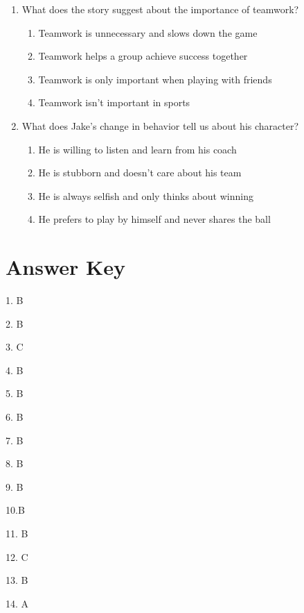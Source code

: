\documentclass[12pt]{article}
\begin{document}
\begin{enumerate}
\vspace{5cm}
    \item What does the story suggest about the importance of teamwork?
    \begin{enumerate}[label=\Alph*.]
        \item Teamwork is unnecessary and slows down the game
        \item Teamwork helps a group achieve success together
        \item Teamwork is only important when playing with friends
        \item Teamwork isn’t important in sports
    \end{enumerate}
    \vspace{0.5cm}

    \item What does Jake's change in behavior tell us about his character?
    \begin{enumerate}[label=\Alph*.]
        \item He is willing to listen and learn from his coach
        \item He is stubborn and doesn’t care about his team
        \item He is always selfish and only thinks about winning
        \item He prefers to play by himself and never shares the ball
    \end{enumerate}
    \vspace{0.5cm}

\end{enumerate}
\newpage
\section*{Answer Key}

1. B  

\vspace{0.2cm}
2. B  

\vspace{0.2cm}
3. C  

\vspace{0.2cm}
4. B 

\vspace{0.2cm}
5. B 

\vspace{0.2cm}
6. B 

\vspace{0.2cm}
7. B  

\vspace{0.2cm}
8. B 

\vspace{0.2cm}
9. B 

\vspace{0.2cm}
10.B 

\vspace{0.2cm}
11. B 

\vspace{0.2cm}
12. C 

\vspace{0.2cm}
13. B

\vspace{0.2cm}
14. A 

\vspace{0.2cm}
\end{document}
